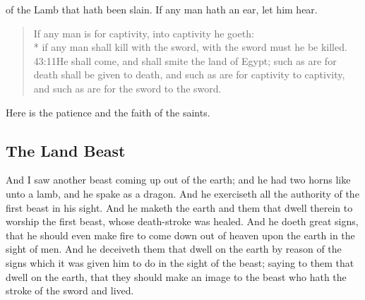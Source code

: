of the Lamb that hath been slain. 
If any man hath an ear, let him hear. 
\begin{verse}
If any man is for captivity, into captivity he goeth:\\* if any man shall kill with the sword, with the sword must he be killed.%
					{43:11}{He shall come, and shall smite the land of Egypt; such as are for death shall be given to death, and such as are for captivity to captivity, and such as are for the sword to the sword.}%
\end{verse}

\noindent
Here is the patience and the faith of the saints.
\subsection*{The Land Beast}
And I saw another beast coming up out of the earth; and he had two horns%
like unto a lamb, and he spake as a dragon. 
And he exerciseth all the authority of the first beast in his sight. And he maketh the earth and them that dwell therein to worship the first beast, whose death-stroke was healed. 
And he doeth great signs, that he should even make fire to come down out of heaven upon the earth in the sight of men.%
And he deceiveth them that dwell on the earth by reason of the signs which it was given him to do in the sight of the beast; saying to them that dwell on the earth, that they should make an image to the beast who hath the stroke of the sword and lived. 

